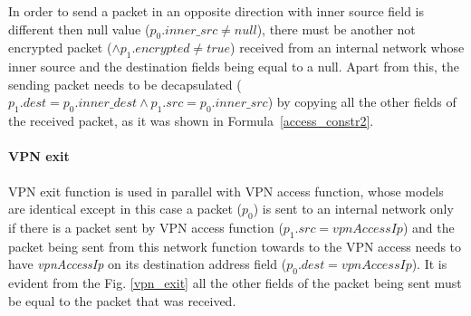 In order to send a packet in an opposite direction with inner source field is different then null value ($p_{0}.inner\_src \neq null$), there must be another not encrypted packet ($\wedge p_{1}.encrypted \neq true $) received  from an internal network whose inner source and the destination fields being equal to a null. Apart from this, the sending packet needs to be decapsulated ($p_{1}.dest =  p_{0}.inner\_dest\wedge p_{1}.src = p_{0}.inner\_src$) by copying all the other fields of the received packet, as it was shown in Formula~\ref{access_constr2}.



\paragraph{VPN exit}
VPN exit function is used in parallel with VPN access function, whose models are identical except in this case a packet ($p_0$) is sent to an internal network only if there is a packet sent by VPN access function ($p_{1}.src = vpnAccessIp$) and the packet being sent from this network function towards to the VPN access needs to have \textit{vpnAccessIp} on its destination address field ($ p_{0}.dest = vpnAccessIp$). It is evident from the Fig. \ref{vpn_exit} all the other fields of the packet being sent must be equal to the packet that was received.


